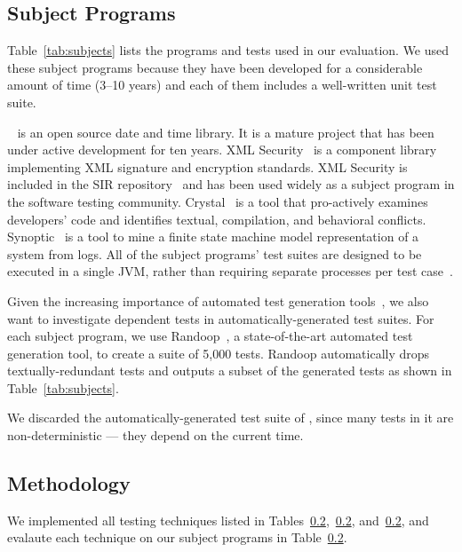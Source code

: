\subsection{Subject Programs}
\label{sec:subj}

Table~\ref{tab:subjects} lists the programs and
tests used in our evaluation. We used these subject
programs because they have been developed for
a considerable amount of time (3--10 years) and each
of them includes a well-written unit test suite.

\jt~\cite{jodatime} is an open source
date and time library. It is a mature project that
has been under active development
for ten years. XML Security~\cite{xmlsecurity}
is a component library implementing XML signature and encryption
standards. XML Security is included in
the SIR repository~\cite{sir} and has been used widely
as a subject program in the software testing community.
Crystal~\cite{crystal} is a tool that
pro-actively examines developers' code and
identifies textual, compilation, and behavioral conflicts.
Synoptic~\cite{synoptic} is a tool to mine a finite state
machine model representation of a system from logs.
All of the subject programs' test suites are designed to be executed in
a single JVM, rather than requiring separate processes per test case~\cite{vmvm}.

Given the increasing importance of automated test generation
tools~\cite{PachecoLET2007, ZhangSBE2011, Csallner:2004, fraseretal:ISSTA:2011},
we also want to investigate dependent tests in automatically-generated
test suites. For each subject program, we use
Randoop~\cite{PachecoLET2007}, a state-of-the-art automated
test generation tool, to create a suite of 5,000 tests.
Randoop automatically drops textually-redundant tests 
and outputs a subset of the generated tests as
shown in Table~\ref{tab:subjects}.

We discarded the automatically-generated test suite of
\jt, since many tests in it are non-deterministic ---
they depend on the current time.


\subsection{Methodology}

We implemented all testing techniques listed
in Tables~\ref{},~\ref{}, and~\ref{}, and evalaute
each technique on our subject programs in
Table~\ref{}.

